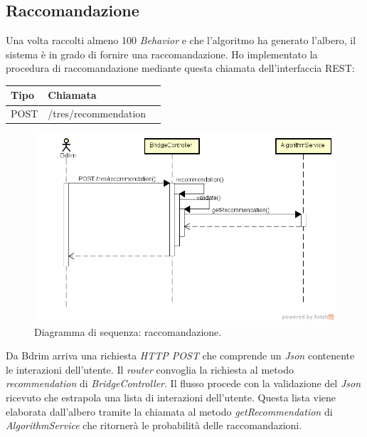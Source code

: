 \subsection{Raccomandazione}
Una volta raccolti almeno 100 \emph{Behavior} e che l'algoritmo ha generato l'albero, il sistema è in grado di fornire una raccomandazione. Ho implementato la procedura di raccomandazione mediante questa chiamata dell'interfaccia REST:
\def\arraystretch{1.5}
\begin{longtable}{|p{2.5cm}|p{5cm}|l|}
\hline
\textbf{Tipo} &	\textbf{Chiamata}	\\\hline
POST	&	/tres/recommendation	 \\\hline
\end{longtable}
\begin{figure}[h]
\centering
\includegraphics[scale=0.42]{immagini/DSracommandazione}
\caption{Diagramma di sequenza: raccomandazione.}
\label{fig:seq-inserimentobeh}
\end{figure}
Da Bdrim arriva una richiesta \emph{HTTP POST} che comprende un \emph{Json} contenente le interazioni dell'utente. Il \emph{router} convoglia la richiesta al metodo \emph{recommendation} di \emph{BridgeController}. Il flusso procede con la validazione del \emph{Json} ricevuto che estrapola una lista di interazioni dell'utente. Questa lista viene elaborata dall'albero tramite la chiamata al metodo \emph{getRecommendation} di \emph{AlgorithmService} che ritornerà le probabilità delle raccomandazioni. 




\newpage
